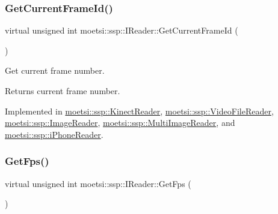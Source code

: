 \subsubsection{\texorpdfstring{Get\+Current\+Frame\+Id()}{GetCurrentFrameId()}\hspace{0.1cm}{\footnotesize\ttfamily [2/2]}}
{\footnotesize\ttfamily virtual unsigned int moetsi\+::ssp\+::\+I\+Reader\+::\+Get\+Current\+Frame\+Id (\begin{DoxyParamCaption}{ }\end{DoxyParamCaption})\hspace{0.3cm}{\ttfamily [pure virtual]}}



Get current frame number. 

\begin{DoxyReturn}{Returns}
current frame number. 
\end{DoxyReturn}


Implemented in \hyperlink{classmoetsi_1_1ssp_1_1KinectReader_aa17e268723c41bdad5082575decb28eb}{moetsi\+::ssp\+::\+Kinect\+Reader}, \hyperlink{classmoetsi_1_1ssp_1_1VideoFileReader_aef5c92da2645cddc7e4ffcfd34ad4b8a}{moetsi\+::ssp\+::\+Video\+File\+Reader}, \hyperlink{classmoetsi_1_1ssp_1_1ImageReader_a386125736df9f25e5c4312bb679ff031}{moetsi\+::ssp\+::\+Image\+Reader}, \hyperlink{classmoetsi_1_1ssp_1_1MultiImageReader_a994eea20e9682c2f4afc9303a34c76f3}{moetsi\+::ssp\+::\+Multi\+Image\+Reader}, and \hyperlink{classmoetsi_1_1ssp_1_1iPhoneReader_a78792c6319743aed3ef2afc96fe16485}{moetsi\+::ssp\+::i\+Phone\+Reader}.

\mbox{\label{classmoetsi_1_1ssp_1_1IReader_a9f6a8650ca290b011b8e5451eeae9f32}} 
\subsubsection{\texorpdfstring{Get\+Fps()}{GetFps()}\hspace{0.1cm}{\footnotesize\ttfamily [1/2]}}
{\footnotesize\ttfamily virtual unsigned int moetsi\+::ssp\+::\+I\+Reader\+::\+Get\+Fps (\begin{DoxyParamCaption}{ }\end{DoxyParamCaption})\hspace{0.3cm}{\ttfamily [pure virtual]}}



